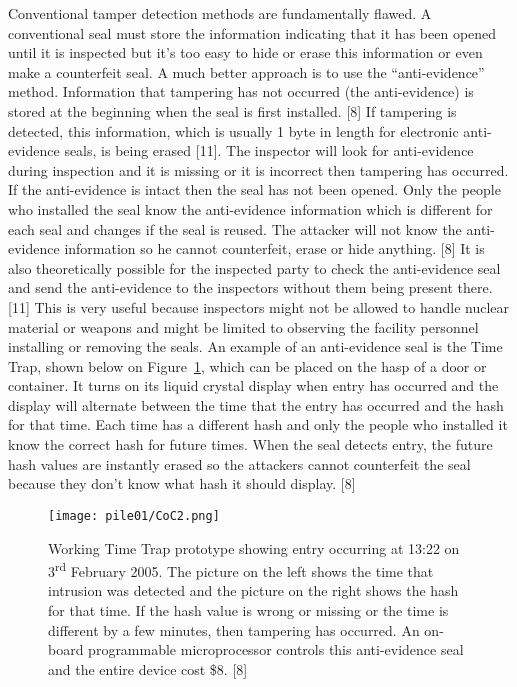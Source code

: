 \documentclass[twocolumn,a4paper]{article}
\begin{document}
Conventional tamper detection methods are fundamentally flawed. A conventional seal must store the 
information indicating that it has been opened until it is inspected but it’s too easy to hide or 
erase this information or even make a counterfeit seal. A much better approach is to use the 
``anti-evidence'' method. Information that tampering has not occurred (the anti-evidence) is stored 
at the beginning when the seal is first installed. [8] If tampering is detected, this information, 
which is usually 1 byte in length for electronic anti-evidence seals, is being erased [11]. 
The inspector will look for anti-evidence during inspection and it is missing or it is incorrect 
then tampering has occurred. If the anti-evidence is intact then the seal has not been opened. Only 
the people who installed the seal know the anti-evidence information which is different for each seal 
and changes if the seal is reused. The attacker will not know the anti-evidence information so he 
cannot counterfeit, erase or hide anything. [8] It is also theoretically possible for the inspected 
party to check the anti-evidence seal and send the anti-evidence to the inspectors without them being 
present there. [11] This is very useful because inspectors might not be allowed to handle nuclear 
material or weapons and might be limited to observing the facility personnel installing or removing 
the seals. An example of an anti-evidence seal is the Time Trap, shown below on Figure~\ref{CoC2}, 
which can be placed on the hasp of a door or container. It turns on its liquid crystal display when 
entry has occurred and the display will alternate between the time that the entry has occurred and the 
hash for that time. Each time has a different hash and only the people who installed it know the correct 
hash for future times. When the seal detects entry, the future hash values are instantly erased so 
the attackers cannot counterfeit the seal because they don't know what hash it should display. [8]

\begin{figure}
  \texttt{[image: pile01/CoC2.png]}
  \caption{Working Time Trap prototype showing entry occurring at 13:22 on 3\textsuperscript{rd} 
		   February 2005. The picture on the left shows the time that intrusion was detected and the 
		   picture on the right shows the hash for that time. If the hash value is wrong or missing or 
		   the time is different by a few minutes, then tampering has occurred. An on-board programmable 
			microprocessor controls this anti-evidence seal and the entire device cost \$8. [8]}
  \label{CoC2}
\end{figure}
\end{document}
